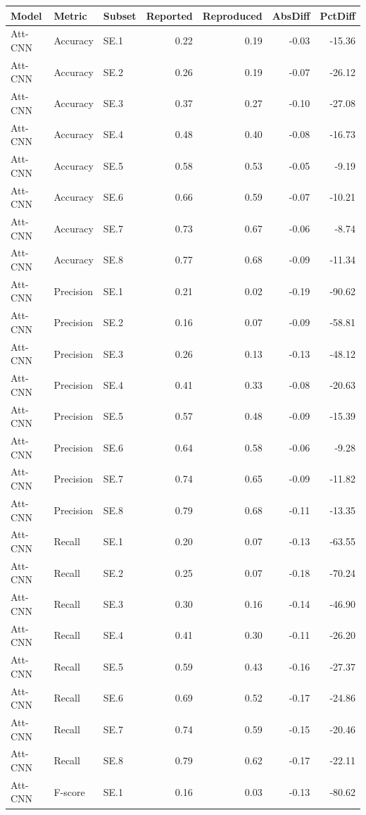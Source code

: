 \begin{tabular}{lllrrrr}
\toprule
Model & Metric & Subset & Reported & Reproduced & AbsDiff & PctDiff \\
\midrule
Att-CNN & Accuracy & SE.1 & 0.22 & 0.19 & -0.03 & -15.36 \\
Att-CNN & Accuracy & SE.2 & 0.26 & 0.19 & -0.07 & -26.12 \\
Att-CNN & Accuracy & SE.3 & 0.37 & 0.27 & -0.10 & -27.08 \\
Att-CNN & Accuracy & SE.4 & 0.48 & 0.40 & -0.08 & -16.73 \\
Att-CNN & Accuracy & SE.5 & 0.58 & 0.53 & -0.05 & -9.19 \\
Att-CNN & Accuracy & SE.6 & 0.66 & 0.59 & -0.07 & -10.21 \\
Att-CNN & Accuracy & SE.7 & 0.73 & 0.67 & -0.06 & -8.74 \\
Att-CNN & Accuracy & SE.8 & 0.77 & 0.68 & -0.09 & -11.34 \\
Att-CNN & Precision & SE.1 & 0.21 & 0.02 & -0.19 & -90.62 \\
Att-CNN & Precision & SE.2 & 0.16 & 0.07 & -0.09 & -58.81 \\
Att-CNN & Precision & SE.3 & 0.26 & 0.13 & -0.13 & -48.12 \\
Att-CNN & Precision & SE.4 & 0.41 & 0.33 & -0.08 & -20.63 \\
Att-CNN & Precision & SE.5 & 0.57 & 0.48 & -0.09 & -15.39 \\
Att-CNN & Precision & SE.6 & 0.64 & 0.58 & -0.06 & -9.28 \\
Att-CNN & Precision & SE.7 & 0.74 & 0.65 & -0.09 & -11.82 \\
Att-CNN & Precision & SE.8 & 0.79 & 0.68 & -0.11 & -13.35 \\
Att-CNN & Recall & SE.1 & 0.20 & 0.07 & -0.13 & -63.55 \\
Att-CNN & Recall & SE.2 & 0.25 & 0.07 & -0.18 & -70.24 \\
Att-CNN & Recall & SE.3 & 0.30 & 0.16 & -0.14 & -46.90 \\
Att-CNN & Recall & SE.4 & 0.41 & 0.30 & -0.11 & -26.20 \\
Att-CNN & Recall & SE.5 & 0.59 & 0.43 & -0.16 & -27.37 \\
Att-CNN & Recall & SE.6 & 0.69 & 0.52 & -0.17 & -24.86 \\
Att-CNN & Recall & SE.7 & 0.74 & 0.59 & -0.15 & -20.46 \\
Att-CNN & Recall & SE.8 & 0.79 & 0.62 & -0.17 & -22.11 \\
Att-CNN & F-score & SE.1 & 0.16 & 0.03 & -0.13 & -80.62 \\

\end{tabular}
